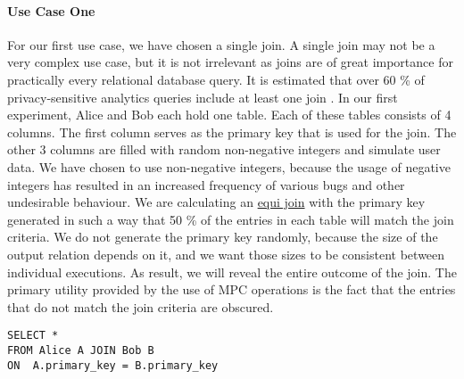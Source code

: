 \paragraph{Use Case One}
For our first use case, we have chosen a single join. A single join may not be a very complex use case, but it is not irrelevant as joins are of great importance for practically every relational database query. It is estimated that over 60 \% of privacy-sensitive analytics queries include at least one join \cite{johnson2017practical}. In our first experiment, Alice and Bob each hold one table. Each of these tables consists of 4 columns. The first column serves as the primary key that is used for the join. The other 3 columns are filled with random non-negative integers and simulate user data. We have chosen to use non-negative integers, because the usage of negative integers has resulted in an  increased frequency of various bugs and other undesirable behaviour. We are calculating an \hyperref[Databases]{equi join}  with the primary key generated in such a way that 50 \% of the entries in each table will match the join criteria. We do not generate the primary key randomly, because the size of the output relation depends on it, and we want those sizes to be consistent between individual executions. As result, we will reveal the entire outcome of the join. The primary utility provided by the use of MPC operations is the fact that the entries that do not match the join criteria are obscured.

\label{SQL1_label}				
\begin{lstlisting}[caption={ Functional equivalent SQL statement for our first use case  }]
SELECT * 
FROM Alice A JOIN Bob B 
ON  A.primary_key = B.primary_key
\end{lstlisting}
\label{SQL1}
	\label{Use Case two}		

